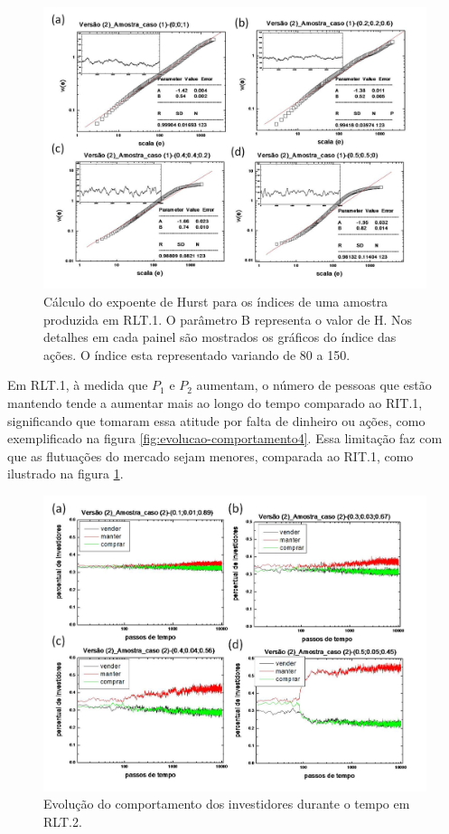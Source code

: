 \documentclass[brazil,ruledheader]{abnt}
\begin{document}
\begin{figure}[!h]
\centering
\includegraphics[width=0.8\linewidth]{Figuras/13.jpg}
\caption[ Cálculo do expoente de Hurst para os índices em RLT.1] {Cálculo do
expoente de Hurst para os índices de uma amostra produzida em RLT.1.  O
parâmetro B representa
o valor de H. Nos detalhes em cada painel são mostrados os gráficos do índice
das ações. O índice esta representado variando de 80 a 150.}
\label{fig:calculo-expoente-hurst5}
\end{figure}

Em RLT.1, à medida que  $P_1$ e $P_2$ aumentam, o número de
pessoas que estão mantendo tende a aumentar mais ao longo do tempo comparado ao
RIT.1, significando que tomaram essa atitude por falta de
dinheiro ou ações, como exemplificado na figura
\ref{fig:evolucao-comportamento4}. Essa limitação faz com que as flutuações do
mercado sejam menores, comparada ao RIT.1, como ilustrado na
figura \ref{fig:calculo-expoente-hurst5}.

\begin{figure}[!h]
\centering
\includegraphics[width=0.8\linewidth]{Figuras/14.jpg}
\caption[Evolução do comportamento dos investidores em RLT.2]{Evolução do
comportamento dos investidores durante o tempo em RLT.2.}
\label{fig:evolucao-comportamento5}
\end{figure}
\end{document}
